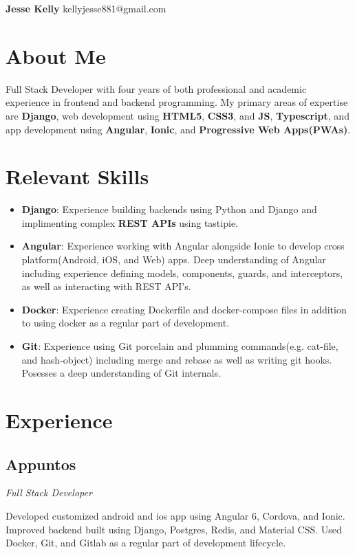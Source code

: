 \documentclass[letterpaper,11pt]{article}
\begin{document}
\begin{flushleft}
\Large{\textbf{Jesse Kelly}}
\newline
kellyjesse881@gmail.com
\end{flushleft}

\section{About Me}
Full Stack Developer with four years of both
professional and academic experience in frontend
and backend programming. My primary areas of
expertise are \textbf{Django}, web development using \textbf{HTML5},
\textbf{CSS3}, and \textbf{JS}, \textbf{Typescript}, and app development using
\textbf{Angular}, \textbf{Ionic}, and \textbf{Progressive Web Apps(PWAs)}.

\section{Relevant Skills}
\begin{itemize}
\item \textbf{Django}: Experience building backends using Python and Django and implimenting complex \textbf{REST APIs} using tastipie.
\item \textbf{Angular}: Experience working with Angular alongside Ionic to develop cross platform(Android, iOS, and Web) apps. Deep understanding of Angular including experience defining models, components, guards, and interceptors, as well as interacting with REST API's.
\item \textbf{Docker}: Experience creating Dockerfile and docker-compose files in addition to using docker as a regular part of development.
\item \textbf{Git}: Experience using Git porcelain and plumming commands(e.g. cat-file, and hash-object) including merge and rebase as well as writing git hooks. Posesses a deep understanding of Git internals.
\end{itemize}

\section{Experience}
\subsection{Appuntos}
\textit{Full Stack Developer}
\vspace{2mm}
\begin{adjustwidth}{1cm}{1cm}
Developed customized android and ios
app using Angular 6, Cordova, and Ionic.
Improved backend built using Django,
Postgres, Redis, and Material CSS. Used
Docker, Git, and Gitlab as a regular part
of development lifecycle.
\end{adjustwidth}
\end{document}
